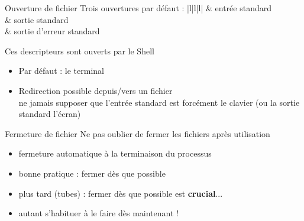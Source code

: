 \begin {frame} {Ouverture de fichier}
    Trois ouvertures par défaut :
    \ctableau {} {|l|l|l|} {
	 & entrée standard \\
	 & sortie standard \\
	 & sortie d'erreur standard \\
    }

    \vspace* {3mm}
    Ces descripteurs sont ouverts par le Shell
    \begin {itemize}
	\item Par défaut : le terminal
	\item Redirection possible depuis/vers un fichier
	    \\
	    \implique ne jamais supposer que l'entrée standard est
	    forcément le clavier (ou la sortie standard l'écran)
    \end {itemize}
\end {frame}

\begin {frame} {Fermeture de fichier}
    Ne pas oublier de fermer les fichiers après utilisation

    \begin {itemize}
	\item fermeture automatique à la terminaison du processus
	\item bonne pratique : fermer dès que possible
	\item plus tard (tubes) : fermer dès que possible est \textbf
	    {crucial}...
	\item autant s'habituer à le faire dès maintenant !

    \end {itemize}
\end {frame}


